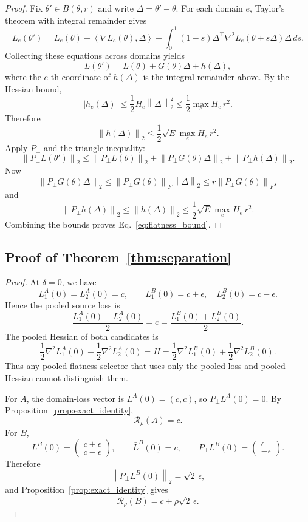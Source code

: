 \documentclass{article}
\theoremstyle{definition}
\newcommand{\norm}[1]{\left\lVert #1 \right\rVert}
\newcommand{\abs}[1]{\left\lvert #1 \right\rvert}
\newcommand{\inner}[2]{\left\langle #1, #2 \right\rangle}
\begin{document}
\begin{proof}
Fix \(\theta' \in B(\theta,r)\) and write \(\Delta=\theta'-\theta\). For each domain \(e\), Taylor's theorem with integral remainder gives
\[
L_e(\theta')
=
L_e(\theta)
+ \inner{\nabla L_e(\theta)}{\Delta}
+ \int_{0}^{1}(1-s)\Delta^\top \nabla^2 L_e(\theta+s\Delta)\Delta \, ds.
\]
Collecting these equations across domains yields
\[
L(\theta')
=
L(\theta) + G(\theta)\Delta + h(\Delta),
\]
where the \(e\)-th coordinate of \(h(\Delta)\) is the integral remainder above. By the Hessian bound,
\[
\abs{h_e(\Delta)}
\le
\frac{1}{2}H_e \norm{\Delta}_2^2
\le
\frac{1}{2}\max_e H_e \, r^2.
\]
Therefore
\[
\norm{h(\Delta)}_2
\le
\frac{1}{2}\sqrt{E}\max_e H_e \, r^2.
\]
Apply \(P_\perp\) and the triangle inequality:
\[
\norm{P_\perp L(\theta')}_2
\le
\norm{P_\perp L(\theta)}_2
+ \norm{P_\perp G(\theta)\Delta}_2
+ \norm{P_\perp h(\Delta)}_2.
\]
Now
\[
\norm{P_\perp G(\theta)\Delta}_2
\le
\norm{P_\perp G(\theta)}_F \norm{\Delta}_2
\le
r \norm{P_\perp G(\theta)}_F,
\]
and
\[
\norm{P_\perp h(\Delta)}_2 \le \norm{h(\Delta)}_2
\le
\frac{1}{2}\sqrt{E}\max_e H_e \, r^2.
\]
Combining the bounds proves Eq.~\eqref{eq:flatness_bound}.
\end{proof}

\subsection{Proof of Theorem~\ref{thm:separation}}

\begin{proof}
At \(\delta=0\), we have
\[
L_1^A(0)=L_2^A(0)=c,
\qquad
L_1^B(0)=c+\epsilon,
\quad
L_2^B(0)=c-\epsilon.
\]
Hence the pooled source loss is
\[
\frac{L_1^A(0)+L_2^A(0)}{2}=c
=
\frac{L_1^B(0)+L_2^B(0)}{2}.
\]
The pooled Hessian of both candidates is
\[
\frac{1}{2}\nabla^2 L_1^A(0)+\frac{1}{2}\nabla^2 L_2^A(0)
=
H
=
\frac{1}{2}\nabla^2 L_1^B(0)+\frac{1}{2}\nabla^2 L_2^B(0).
\]
Thus any pooled-flatness selector that uses only the pooled loss and pooled Hessian cannot distinguish them.

For \(A\), the domain-loss vector is \(L^A(0)=(c,c)\), so \(P_\perp L^A(0)=0\). By Proposition~\ref{prop:exact_identity},
\[
\mathcal R_\rho(A)=c.
\]
For \(B\),
\[
L^B(0)=\begin{pmatrix} c+\epsilon \\ c-\epsilon \end{pmatrix},
\qquad
\bar L^B(0)=c,
\qquad
P_\perp L^B(0)=\begin{pmatrix} \epsilon \\ -\epsilon \end{pmatrix}.
\]
Therefore
\[
\norm{P_\perp L^B(0)}_2=\sqrt{2}\,\epsilon,
\]
and Proposition~\ref{prop:exact_identity} gives
\[
\mathcal R_\rho(B)=c+\rho\sqrt{2}\,\epsilon.
\]
\end{proof}
\end{document}
